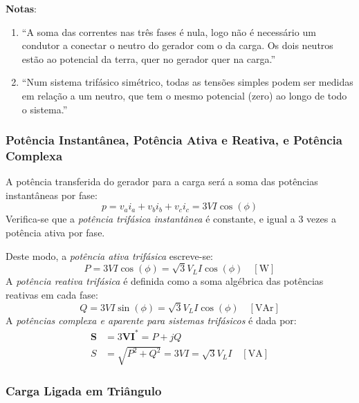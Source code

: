 \begin{mdframed} %
    \noindent \textbf{Notas}:
    \begin{enumerate}[noitemsep,nolistsep,leftmargin=*,label=\arabic*.,font=\small\bfseries]\small
        \item ``A soma das correntes nas três fases é nula, logo não é necessário um condutor a conectar o neutro do gerador com o da carga. Os dois neutros estão ao potencial da terra, quer no gerador quer na carga.''\cite{paiva2005}
        
        \item ``Num sistema trifásico simétrico, todas as tensões simples podem ser medidas em relação a um neutro, que tem o mesmo potencial (zero) ao longo de todo o sistema.''\cite{paiva2005}
    \end{enumerate}
\end{mdframed}

\subsubsection{Potência Instantânea, Potência Ativa e Reativa, e Potência Complexa}

A potência transferida do gerador para a carga será a soma das potências instantâneas por fase:
$$
    p = v_a i_a + v_b i_b + v_c i_c = 3 VI \cos(\phi)
$$
Verifica-se que a \textit{potência trifásica instantânea} é constante, e igual a 3 vezes a potência ativa por fase.

Deste modo, a \textit{potência ativa trifásica} escreve-se:
$$
    P = 3 VI \cos(\phi) = \sqrt{3} V_L I \cos (\phi) \quad [\text{W}]
$$
A \textit{potência reativa trifásica} é definida como a soma algébrica das potências reativas em cada fase:
$$
    Q = 3 VI \sin(\phi) = \sqrt{3} V_L I \cos (\phi) \quad [\text{VAr}]
$$
A \textit{potências complexa e aparente para sistemas trifásicos} é dada por:
$$
\begin{aligned}
    \mathbf{S} &= 3\mathbf{V} \mathbf{I}^* = P + jQ\\
    S &= \sqrt{P^2 + Q^2} = 3VI = \sqrt{3} V_L I \quad [\text{VA}]
\end{aligned}
$$

\subsubsection{Carga Ligada em Triângulo}

